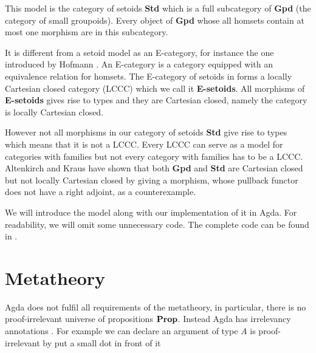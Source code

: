 \begin{remark}\label{nlccc}
This model is the category of setoids \textbf{Std} which is a full subcategory of \textbf{Gpd} (the category of small groupoids). Every object of \textbf{Gpd} whose all homsets contain at most one morphism are in this subcategory. 

It is different from a setoid model as an E-category, for instance
the one introduced by Hofmann \cite{hofmann1994interpretation}. An E-category is a category equipped with
an equivalence relation for homsets. The E-category of setoids in \mltt forms a locally Cartesian closed category (LCCC) which we call it \textbf{E-setoids}.  All morphisms of \textbf{E-setoids}
gives rise to types and they are Cartesian closed, namely the category is locally
Cartesian closed.

However not all morphisms in our category of setoids \textbf{Std} give rise to types which means that it is not a LCCC. Every LCCC can serve as a model for categories with
families but not every category with families has to be a LCCC. 
 Altenkirch and Kraus \cite{Altenkirch12setoidsare} have shown that both \textbf{Gpd} and \textbf{Std} are Cartesian closed but not locally Cartesian closed by giving a morphism, whose pullback functor does not have a right adjoint, as a counterexample.
\end{remark}




We will introduce the model along with our implementation of it in Agda. 
For readability, we will omit some unnecessary code. The complete code can be found in .


\section{Metatheory}

Agda does not fulfil all requirements of the metatheory, in particular, there is no proof-irrelevant universe of propositions $\operatorname{\mathbf{Prop}}$. 
Instead Agda has irrelevancy annotations \cite{prAgda}. For example we can declare an argument of type $A$ is proof-irrelevant by put a small dot in front of it


\begin{code}\>\<%
\\
\> \AgdaSymbol{:}   \<%
\\
\>  \AgdaSymbol{=} \<%
\\
\end{code}

